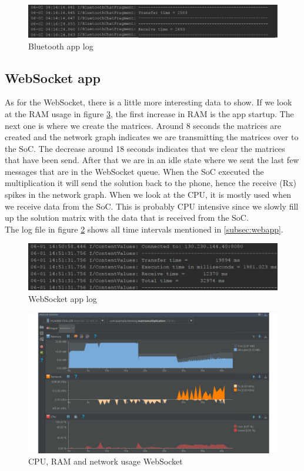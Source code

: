 \documentclass[a4paper, 11pt]{report}
\begin{document}
\begin{figure}[ht]
\centering
\includegraphics[scale=0.5]{images/app3Log.pdf}
\caption{Bluetooth app log}\label{fig:app3log}
\end{figure}

	\subsection{WebSocket app}
As for the WebSocket, there is a little more interesting data to show. If we look at the RAM usage in figure \ref{fig:app2usage}, the first increase in RAM is the app startup. The next one is where we create the matrices. Around 8 seconds the matrices are created and the network graph indicates we are transmitting the matrices over to the SoC. The decrease around 18 seconds indicates that we clear the matrices that have been send. After that we are in an idle state where we sent the last few messages that are in the WebSocket queue. When the SoC executed the multiplication it will send the solution back to the phone, hence the receive (Rx) spikes in the network graph. When we look at the CPU, it is mostly used when we receive data from the SoC. This is probably CPU intensive since we slowly fill up the solution matrix with the data that is received from the SoC.\\
The log file in figure \ref{fig:app2log} shows all time intervals mentioned in \ref{subsec:webapp}.

\begin{figure}[hbtp]
\centering
\includegraphics[scale=0.35]{images/app2resultlog.pdf}
\caption{WebSocket app log}\label{fig:app2log}
\end{figure}

\begin{figure}[hbtp]
\centering
\includegraphics[scale=0.35]{images/app2resultgraph.pdf}
\caption{CPU, RAM and network usage WebSocket}\label{fig:app2usage}
\end{figure}
\end{document}
